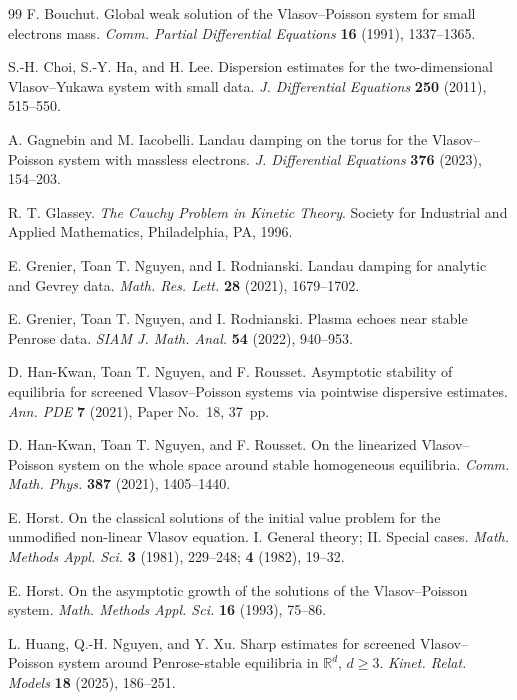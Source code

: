 \documentclass[reqno,11pt]{amsart}
\numberwithin{equation}{section}
\begin{document}
\begin{thebibliography}{99}
	F. Bouchut. Global weak solution of the Vlasov--Poisson system for small electrons mass.
	\emph{Comm. Partial Differential Equations} \textbf{16} (1991), 1337--1365.
	
	S.-H. Choi, S.-Y. Ha, and H. Lee. Dispersion estimates for the two-dimensional Vlasov--Yukawa system with small data.
	\emph{J. Differential Equations} \textbf{250} (2011), 515--550.
	
	A. Gagnebin and M. Iacobelli. Landau damping on the torus for the Vlasov--Poisson system with massless electrons.
	\emph{J. Differential Equations} \textbf{376} (2023), 154--203.
	
	R. T. Glassey. \emph{The Cauchy Problem in Kinetic Theory}.
	Society for Industrial and Applied Mathematics, Philadelphia, PA, 1996.
	
	E. Grenier, Toan T. Nguyen, and I. Rodnianski. Landau damping for analytic and Gevrey data.
	\emph{Math. Res. Lett.} \textbf{28} (2021), 1679--1702.
	
	E. Grenier, Toan T. Nguyen, and I. Rodnianski. Plasma echoes near stable Penrose data.
	\emph{SIAM J. Math. Anal.} \textbf{54} (2022), 940--953.
	
	D. Han-Kwan, Toan T. Nguyen, and F. Rousset. Asymptotic stability of equilibria for screened Vlasov--Poisson systems via pointwise dispersive estimates.
	\emph{Ann. PDE} \textbf{7} (2021), Paper No.~18, 37~pp.
	
	D. Han-Kwan, Toan T. Nguyen, and F. Rousset. On the linearized Vlasov--Poisson system on the whole space around stable homogeneous equilibria.
	\emph{Comm. Math. Phys.} \textbf{387} (2021), 1405--1440.
	
	E. Horst. On the classical solutions of the initial value problem for the unmodified non-linear Vlasov equation. I. General theory; II. Special cases.
	\emph{Math. Methods Appl. Sci.} \textbf{3} (1981), 229--248; \textbf{4} (1982), 19--32.
	
	E. Horst. On the asymptotic growth of the solutions of the Vlasov--Poisson system.
	\emph{Math. Methods Appl. Sci.} \textbf{16} (1993), 75--86.
	
	L. Huang, Q.-H. Nguyen, and Y. Xu. Sharp estimates for screened Vlasov--Poisson system around Penrose-stable equilibria in $\mathbb{R}^d$, $d\geq3$.
	\emph{Kinet. Relat. Models} \textbf{18} (2025), 186--251.
	

\end{thebibliography}
\end{document}
